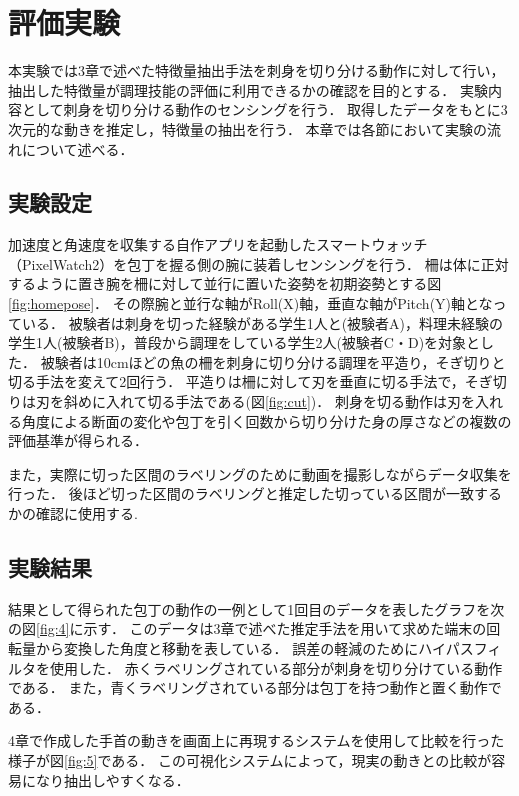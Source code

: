 \chapter{評価実験}
本実験では3章で述べた特徴量抽出手法を刺身を切り分ける動作に対して行い，抽出した特徴量が調理技能の評価に利用できるかの確認を目的とする．
実験内容として刺身を切り分ける動作のセンシングを行う．
取得したデータをもとに3次元的な動きを推定し，特徴量の抽出を行う．
本章では各節において実験の流れについて述べる．
\section{実験設定}
加速度と角速度を収集する自作アプリを起動したスマートウォッチ（PixelWatch2）を包丁を握る側の腕に装着しセンシングを行う．
柵は体に正対するように置き腕を柵に対して並行に置いた姿勢を初期姿勢とする図\ref{fig:homepose}．
その際腕と並行な軸がRoll(X)軸，垂直な軸がPitch(Y)軸となっている．
被験者は刺身を切った経験がある学生1人と(被験者A)，料理未経験の学生1人(被験者B)，普段から調理をしている学生2人(被験者C・D)を対象とした．
被験者は10cmほどの魚の柵を刺身に切り分ける調理を平造り，そぎ切りと切る手法を変えて2回行う．
平造りは柵に対して刃を垂直に切る手法で，そぎ切りは刃を斜めに入れて切る手法である(図\ref{fig:cut})．
刺身を切る動作は刃を入れる角度による断面の変化や包丁を引く回数から切り分けた身の厚さなどの複数の評価基準が得られる．

また，実際に切った区間のラベリングのために動画を撮影しながらデータ収集を行った．
後ほど切った区間のラベリングと推定した切っている区間が一致するかの確認に使用する.
\section{実験結果}
結果として得られた包丁の動作の一例として1回目のデータを表したグラフを次の図\ref{fig:4}に示す．
このデータは3章で述べた推定手法を用いて求めた端末の回転量から変換した角度と移動を表している．
誤差の軽減のためにハイパスフィルタを使用した．
赤くラベリングされている部分が刺身を切り分けている動作である．
また，青くラベリングされている部分は包丁を持つ動作と置く動作である．

4章で作成した手首の動きを画面上に再現するシステムを使用して比較を行った様子が図\ref{fig:5}である．
この可視化システムによって，現実の動きとの比較が容易になり抽出しやすくなる．

